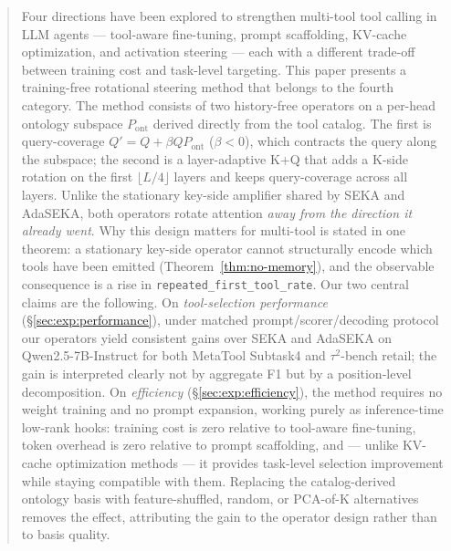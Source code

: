 \begin{abstract}
Four directions have been explored to strengthen multi-tool tool calling in LLM agents --- tool-aware fine-tuning, prompt scaffolding, KV-cache optimization, and activation steering --- each with a different trade-off between training cost and task-level targeting. This paper presents a training-free rotational steering method that belongs to the fourth category. The method consists of two history-free operators on a per-head ontology subspace $P_{\mathrm{ont}}$ derived directly from the tool catalog. The first is query-coverage $Q' = Q + \beta Q P_{\mathrm{ont}}$ ($\beta<0$), which contracts the query along the subspace; the second is a layer-adaptive K+Q that adds a K-side rotation on the first $\lfloor L/4\rfloor$ layers and keeps query-coverage across all layers. Unlike the stationary key-side amplifier shared by SEKA and AdaSEKA, both operators rotate attention \emph{away from the direction it already went}. Why this design matters for multi-tool is stated in one theorem: a stationary key-side operator cannot structurally encode which tools have been emitted (Theorem~\ref{thm:no-memory}), and the observable consequence is a rise in \texttt{repeated\_first\_tool\_rate}. Our two central claims are the following. On \emph{tool-selection performance} (\S\ref{sec:exp:performance}), under matched prompt/scorer/decoding protocol our operators yield consistent gains over SEKA and AdaSEKA on Qwen2.5-7B-Instruct for both MetaTool Subtask4 and $\tau^2$-bench retail; the gain is interpreted clearly not by aggregate F1 but by a position-level decomposition. On \emph{efficiency} (\S\ref{sec:exp:efficiency}), the method requires no weight training and no prompt expansion, working purely as inference-time low-rank hooks: training cost is zero relative to tool-aware fine-tuning, token overhead is zero relative to prompt scaffolding, and --- unlike KV-cache optimization methods --- it provides task-level selection improvement while staying compatible with them. Replacing the catalog-derived ontology basis with feature-shuffled, random, or PCA-of-K alternatives removes the effect, attributing the gain to the operator design rather than to basis quality.
\end{abstract}

